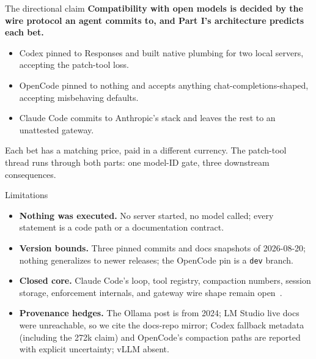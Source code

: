\documentclass[aspectratio=169,11pt]{beamer}
\newcommand{\occ}[0]{OpenCode}
\newcommand{\ccc}[0]{Claude Code}
\begin{document}
\begin{frame}{The directional claim}
  \textbf{Compatibility with open models is decided by the wire protocol
  an agent commits to, and Part I's architecture predicts each bet.}

  \vspace{0.6em}
  \begin{itemize}
    \item \textcolor{nativecol}{Codex} pinned to Responses and built
    native plumbing for two local servers, accepting the patch-tool loss.
    \item \textcolor{genericcol}{OpenCode} pinned to nothing and accepts
    anything chat-completions-shaped, accepting misbehaving defaults.
    \item \textcolor{unattcol}{Claude Code} commits to Anthropic's stack
    and leaves the rest to an unattested gateway.
  \end{itemize}

  \vspace{0.6em}
  Each bet has a matching price, paid in a different currency. The
  patch-tool thread runs through both parts: one model-ID gate, three
  downstream consequences.
\end{frame}

\begin{frame}{Limitations}
  \begin{itemize}
    \item \textbf{Nothing was executed.} No server started, no model
    called; every statement is a code path or a documentation contract.
    \item \textbf{Version bounds.} Three pinned commits and docs
    snapshots of 2026-08-20; nothing generalizes to newer releases; the
    \occ{} pin is a \texttt{dev} branch.
    \item \textbf{Closed core.} \ccc{}'s loop, tool registry, compaction
    numbers, session storage, enforcement internals, and gateway wire
    shape remain open~\citep{claudeCodePluginSurface,claudeCodeModelDocs}.
    \item \textbf{Provenance hedges.} The Ollama post is from 2024; LM
    Studio live docs were unreachable, so we cite the docs-repo mirror;
    Codex fallback metadata (including the 272k claim) and OpenCode's
    compaction paths are reported with explicit uncertainty; vLLM absent.
  \end{itemize}
\end{frame}
\end{document}
